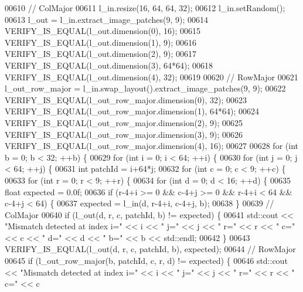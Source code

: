 \begin{DoxyCode}
00610   \textcolor{comment}{// ColMajor}
00611   l\_in.resize(16, 64, 64, 32);
00612   l\_in.setRandom();
00613   l\_out = l\_in.extract\_image\_patches(9, 9);
00614   VERIFY\_IS\_EQUAL(l\_out.dimension(0), 16);
00615   VERIFY\_IS\_EQUAL(l\_out.dimension(1), 9);
00616   VERIFY\_IS\_EQUAL(l\_out.dimension(2), 9);
00617   VERIFY\_IS\_EQUAL(l\_out.dimension(3), 64*64);
00618   VERIFY\_IS\_EQUAL(l\_out.dimension(4), 32);
00619 
00620   \textcolor{comment}{// RowMajor}
00621   l\_out\_row\_major = l\_in.swap\_layout().extract\_image\_patches(9, 9);
00622   VERIFY\_IS\_EQUAL(l\_out\_row\_major.dimension(0), 32);
00623   VERIFY\_IS\_EQUAL(l\_out\_row\_major.dimension(1), 64*64);
00624   VERIFY\_IS\_EQUAL(l\_out\_row\_major.dimension(2), 9);
00625   VERIFY\_IS\_EQUAL(l\_out\_row\_major.dimension(3), 9);
00626   VERIFY\_IS\_EQUAL(l\_out\_row\_major.dimension(4), 16);
00627 
00628   \textcolor{keywordflow}{for} (\textcolor{keywordtype}{int} b = 0; b < 32; ++b) \{
00629     \textcolor{keywordflow}{for} (\textcolor{keywordtype}{int} i = 0; i < 64; ++i) \{
00630       \textcolor{keywordflow}{for} (\textcolor{keywordtype}{int} j = 0; j < 64; ++j) \{
00631         \textcolor{keywordtype}{int} patchId = i+64*j;
00632         \textcolor{keywordflow}{for} (\textcolor{keywordtype}{int} c = 0; c < 9; ++c) \{
00633           \textcolor{keywordflow}{for} (\textcolor{keywordtype}{int} r = 0; r < 9; ++r) \{
00634             \textcolor{keywordflow}{for} (\textcolor{keywordtype}{int} d = 0; d < 16; ++d) \{
00635               \textcolor{keywordtype}{float} expected = 0.0f;
00636               \textcolor{keywordflow}{if} (r-4+i >= 0 && c-4+j >= 0 && r-4+i < 64 && c-4+j < 64) \{
00637                 expected = l\_in(d, r-4+i, c-4+j, b);
00638               \}
00639               \textcolor{comment}{// ColMajor}
00640               \textcolor{keywordflow}{if} (l\_out(d, r, c, patchId, b) != expected) \{
00641                 std::cout << \textcolor{stringliteral}{"Mismatch detected at index i="} << i << \textcolor{stringliteral}{" j="} << j << \textcolor{stringliteral}{" r="} << r << \textcolor{stringliteral}{" c="} << c
       << \textcolor{stringliteral}{" d="} << d << \textcolor{stringliteral}{" b="} << b << std::endl;
00642               \}
00643               VERIFY\_IS\_EQUAL(l\_out(d, r, c, patchId, b), expected);
00644               \textcolor{comment}{// RowMajor}
00645               \textcolor{keywordflow}{if} (l\_out\_row\_major(b, patchId, c, r, d) != expected) \{
00646                 std::cout << \textcolor{stringliteral}{"Mismatch detected at index i="} << i << \textcolor{stringliteral}{" j="} << j << \textcolor{stringliteral}{" r="} << r << \textcolor{stringliteral}{" c="} << c

\end{DoxyCode}
